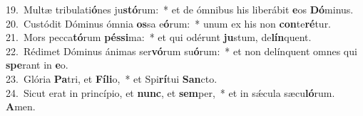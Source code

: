 {19.~}Multæ tribulati\textbf{ó}nes ju\textbf{stó}rum:~* et de ómnibus his liberábit \textbf{e}os \textbf{Dó}minus.\\
{20.~}Custódit Dóminus ómnia \textbf{os}sa e\textbf{ó}rum:~* unum ex his non \textbf{con}te\textbf{ré}tur.\\
{21.~}Mors pecca\textbf{tó}rum \textbf{pés}\textbf{si}ma:~* et qui odérunt \textbf{ju}stum, de\textbf{lín}quent.\\
{22.~}Rédimet Dóminus ánimas ser\textbf{vó}rum su\textbf{ó}rum:~* et non delínquent omnes qui \textbf{spe}rant in \textbf{e}o.\\
{23.~}Glória \textbf{Pa}tri, et \textbf{Fí}\textbf{li}o,~* et Spi\textbf{rí}tui \textbf{San}cto.\\
{24.~}Sicut erat in princípio, et \textbf{nunc}, et \textbf{sem}per,~* et in sǽcula sæcu\textbf{ló}rum. \textbf{A}men.\\
